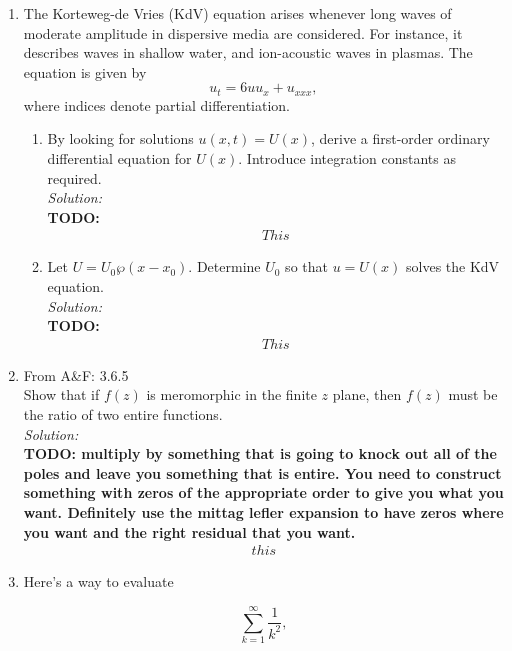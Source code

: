 \documentclass[10pt]{amsart}
\theoremstyle{nonumberplain}
\begin{document}
\mline
\begin{enumerate}[label={\bf {\arabic*}:}]
\item  The Korteweg-de Vries (KdV) equation arises whenever long waves of moderate amplitude in dispersive media are considered. For instance, it describes waves in shallow water, and ion-acoustic waves in plasmas. The equation is given by
$$ u_t=6 u u_x+u_{x x x}, $$
where indices denote partial differentiation.
\begin{enumerate}
\item By looking for solutions $u(x, t)=U(x)$, derive a first-order ordinary differential equation for $U(x)$. Introduce integration constants as required. \\

\noindent
\textit{Solution:} \\
\textbf{TODO:}
\begin{align*}
This
\end{align*}


\item Let $U=U_0 \wp\left(x-x_0\right)$. Determine $U_0$ so that
  $u=U(x)$ solves the KdV equation.\\

\noindent
\textit{Solution:} \\
\textbf{TODO:}
\begin{align*}
This
\end{align*}
\end{enumerate}
\newpage

\item From A\&F: 3.6.5\\
Show that if $f (z)$ is meromorphic in the finite $z$ plane, then $f (z)$ must be
the ratio of two entire functions. \\

\noindent
\textit{Solution:} \\
\textbf{TODO: multiply by something that is going to knock out all of the poles and leave you something that is entire. You need to construct something with zeros of the appropriate order to give you what you want. Definitely use the mittag lefler expansion to have zeros where you want and the right residual that you want.}
\begin{align*}
this
\end{align*}

\newpage

\item Here's a way to evaluate

$$
\sum_{k=1}^{\infty} \frac{1}{k^2},
$$


\end{enumerate}
\end{document}
